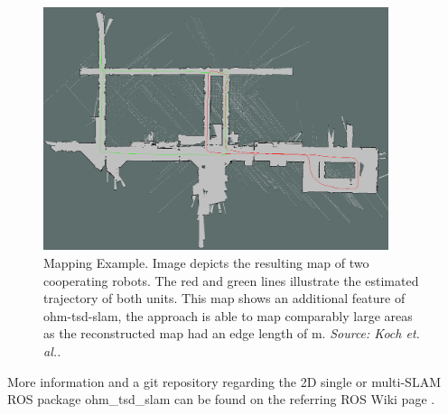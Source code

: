 \begin{figure}[h!]
\begin{center}
\includegraphics[width=0.9\textwidth]{img/multislam_big.png}
\end{center}
\caption{Mapping Example. Image depicts the resulting map of two cooperating robots. The red and green lines illustrate the estimated trajectory of both units. This map shows an additional feature of ohm-tsd-slam, the approach is able to map comparably large areas as the reconstructed map had an edge length of \unit[122]{m}. \textit{Source: Koch et. al.\cite{Koch2015}.}}
\label{fig:slam_map_expl}
\end{figure}


More information and a git repository regarding the 2D single or multi-SLAM ROS package ohm\_tsd\_slam can be found on the referring ROS Wiki page \cite{ohmtsdslam:ros}.

